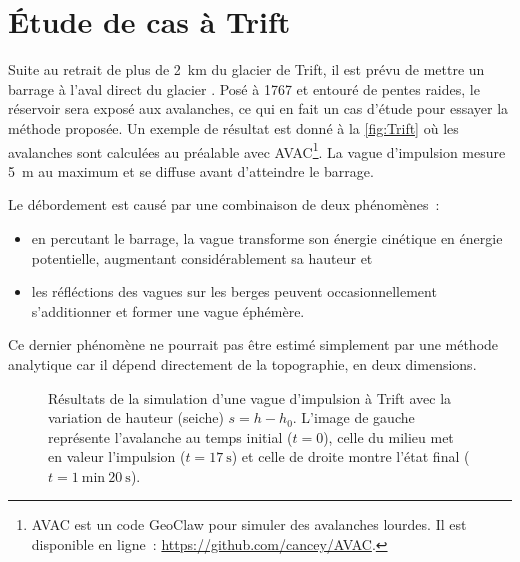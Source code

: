 \section{Étude de cas à Trift}

Suite au retrait de plus de \SI{2}{\kilo\meter} du glacier de Trift,
il est prévu de mettre un barrage à l'aval direct du glacier \citep{manso}.
Posé à \SI{1767}{\msm} et entouré de pentes raides, le réservoir sera exposé aux avalanches,
ce qui en fait un cas d'étude pour essayer la méthode proposée.
Un exemple de résultat est donné à la \autoref{fig:Trift} où les avalanches sont calculées au préalable avec AVAC\footnote{
    AVAC est un code GeoClaw pour simuler des avalanches lourdes. Il est disponible en ligne~:
    \href{https://github.com/cancey/AVAC}{https://github.com/cancey/AVAC}.
}.
La vague d'impulsion mesure \SI{5}{\meter} au maximum et se diffuse avant d'atteindre le barrage.

Le débordement est causé par une combinaison de deux phénomènes~:
\begin{itemize}
    \item en percutant le barrage, la vague transforme son énergie cinétique en énergie potentielle, augmentant considérablement sa hauteur et
    \item les réfléctions des vagues sur les berges peuvent occasionnellement s'additionner et former une vague éphémère.
\end{itemize}

Ce dernier phénomène ne pourrait pas être estimé simplement par une méthode analytique car il dépend directement de la topographie, en deux dimensions.

\begin{figure}
    \centering
    
    \caption{Résultats de la simulation d'une vague d'impulsion à Trift avec la variation de hauteur (seiche) $s=h-h_0$.
    L'image de gauche représente l'avalanche au temps initial ($t=0$),
    celle du milieu met en valeur l'impulsion ($t=\SI{17}{\second}$)
    et celle de droite montre l'état final ($t=\SI{1}{\minute}~\SI{20}{\second}$).}
    \label{fig:Trift}
\end{figure}

